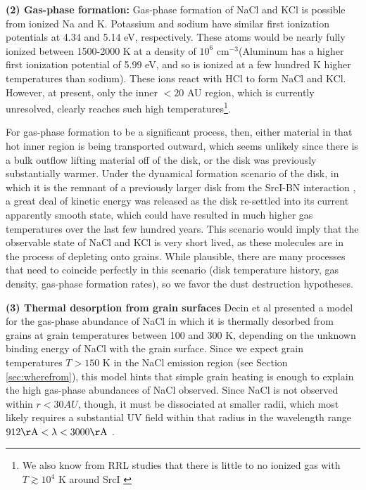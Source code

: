 \documentclass[12pt]{article}
\newcommand{\sourcei}{SrcI\xspace}
\newcommand{\percc}{\ensuremath{\textrm{cm}^{-3}}\xspace}
\begin{document}
\textbf{(2) Gas-phase formation:}
Gas-phase formation of NaCl and KCl is possible from ionized Na and K.
Potassium and sodium have similar first ionization potentials at 4.34 and 5.14
eV, respectively.  These atoms would be nearly fully ionized between 1500-2000
K at a density of $10^6$ \percc (Aluminum has a higher first ionization
potential of 5.99 eV, and so is ionized at a few hundred K higher temperatures
than sodium).  These ions react with HCl to form NaCl and KCl.  However, at
present, only the inner $<20$ AU region, which is currently unresolved, clearly
reaches such high temperatures\footnote{We also know from RRL studies that
there is little to no ionized gas with $T\gtrsim10^4$ K around \sourcei
\cite{Plambeck2016a,Baez-Rubio2018a}}.  

For gas-phase formation to be a significant process, then, either material in
that hot inner region is being transported outward, which seems unlikely since
there is a bulk outflow lifting material off of the disk, or the disk was
previously substantially warmer.  Under the dynamical formation scenario of the
disk, in which it is the remnant of a previously larger disk from the
\sourcei-BN interaction \cite{Bally2017a,Luhman2017a}, a great deal of kinetic
energy was released as the disk re-settled into its current apparently smooth
state, which could have resulted in much higher gas temperatures over the last
few hundred years.  This scenario would imply that the observable state of NaCl
and KCl is very short lived, as these molecules are in the process of depleting
onto grains.  While plausible, there are many processes that need to coincide
perfectly in this scenario (disk temperature history, gas density, gas-phase
formation rates), so we favor the dust destruction hypotheses.

\textbf{(3) Thermal desorption from grain surfaces}
Decin et al \cite{Decin2016a} presented a model for the gas-phase abundance of
NaCl in which it is thermally desorbed from grains at grain temperatures
between 100 and 300 K, depending on the unknown binding energy of NaCl with
the grain surface.  Since we expect grain temperatures $T>150$ K in the
NaCl emission region (see Section \ref{sec:wherefrom}), this model hints
that simple grain heating is enough to explain the high gas-phase abundances
of NaCl observed.  Since NaCl is not observed within $r<30 AU$, though,
it must be dissociated at smaller radii, which most likely requires
a substantial UV field within that radius in the wavelength range
$912 \mathrm{\AA} < \lambda < 3000 \mathrm{\AA}$ \cite{Silver1986a}.
\end{document}
